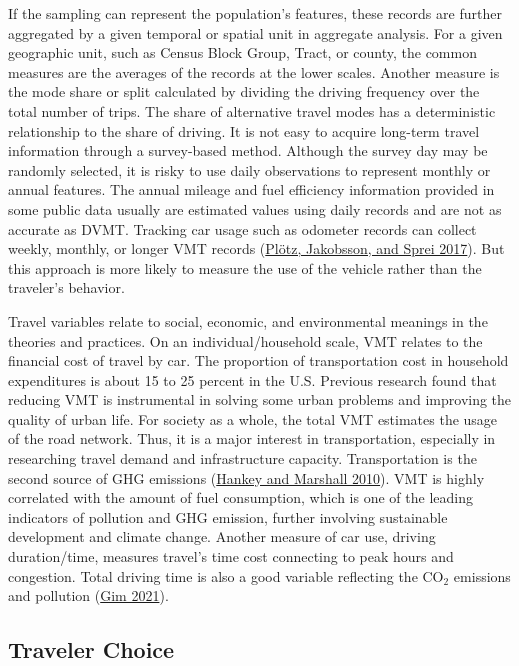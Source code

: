 \documentclass[
  12pt,
]{article}
\begin{document}
If the sampling can represent the population's features, these records are further aggregated by a given temporal or spatial unit in aggregate analysis. For a given geographic unit, such as Census Block Group, Tract, or county, the common measures are the averages of the records at the lower scales. Another measure is the mode share or split calculated by dividing the driving frequency over the total number of trips. The share of alternative travel modes has a deterministic relationship to the share of driving. It is not easy to acquire long-term travel information through a survey-based method. Although the survey day may be randomly selected, it is risky to use daily observations to represent monthly or annual features. The annual mileage and fuel efficiency information provided in some public data usually are estimated values using daily records and are not as accurate as DVMT. Tracking car usage such as odometer records can collect weekly, monthly, or longer VMT records (\protect\hyperlink{ref-plotzDistributionIndividualDaily2017}{Plötz, Jakobsson, and Sprei 2017}). But this approach is more likely to measure the use of the vehicle rather than the traveler's behavior.

Travel variables relate to social, economic, and environmental meanings in the theories and practices. On an individual/household scale, VMT relates to the financial cost of travel by car. The proportion of transportation cost in household expenditures is about 15 to 25 percent in the U.S. Previous research found that reducing VMT is instrumental in solving some urban problems and improving the quality of urban life. For society as a whole, the total VMT estimates the usage of the road network. Thus, it is a major interest in transportation, especially in researching travel demand and infrastructure capacity. Transportation is the second source of GHG emissions (\protect\hyperlink{ref-hankeyImpactsUrbanForm2010}{Hankey and Marshall 2010}). VMT is highly correlated with the amount of fuel consumption, which is one of the leading indicators of pollution and GHG emission, further involving sustainable development and climate change. Another measure of car use, driving duration/time, measures travel's time cost connecting to peak hours and congestion. Total driving time is also a good variable reflecting the CO\(_2\) emissions and pollution (\protect\hyperlink{ref-gimAnalyzingCitylevelEffects2021}{Gim 2021}).

\hypertarget{traveler-choice}{%
\subsection{Traveler Choice}\label{traveler-choice}}
\end{document}
